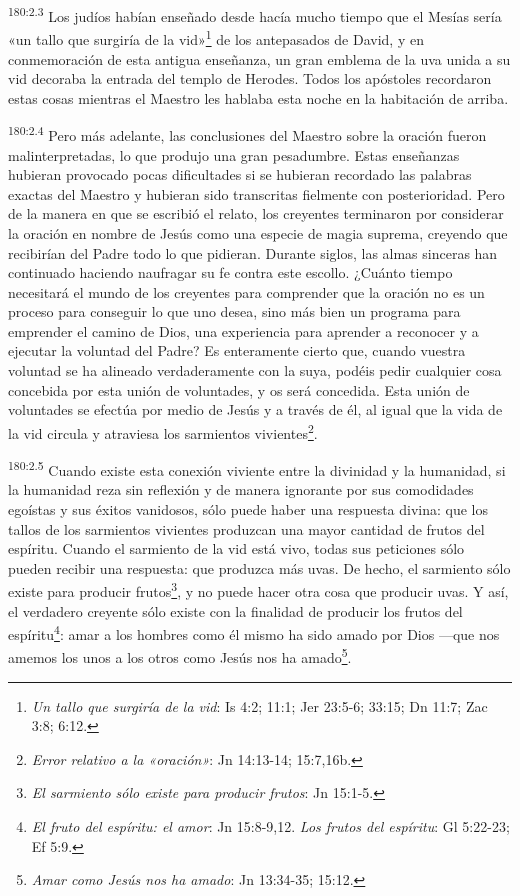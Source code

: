 \par
\textsuperscript{180:2.3} Los judíos habían enseñado desde hacía mucho tiempo que el Mesías sería «un tallo que surgiría de la vid»\footnote{\textit{Un tallo que surgiría de la vid}: Is 4:2; 11:1; Jer 23:5-6; 33:15; Dn 11:7; Zac 3:8; 6:12.} de los antepasados de David, y en conmemoración de esta antigua enseñanza, un gran emblema de la uva unida a su vid decoraba la entrada del templo de Herodes. Todos los apóstoles recordaron estas cosas mientras el Maestro les hablaba esta noche en la habitación de arriba.

\par
\textsuperscript{180:2.4} Pero más adelante, las conclusiones del Maestro sobre la oración fueron malinterpretadas, lo que produjo una gran pesadumbre. Estas enseñanzas hubieran provocado pocas dificultades si se hubieran recordado las palabras exactas del Maestro y hubieran sido transcritas fielmente con posterioridad. Pero de la manera en que se escribió el relato, los creyentes terminaron por considerar la oración en nombre de Jesús como una especie de magia suprema, creyendo que recibirían del Padre todo lo que pidieran. Durante siglos, las almas sinceras han continuado haciendo naufragar su fe contra este escollo. ¿Cuánto tiempo necesitará el mundo de los creyentes para comprender que la oración no es un proceso para conseguir lo que uno desea, sino más bien un programa para emprender el camino de Dios, una experiencia para aprender a reconocer y a ejecutar la voluntad del Padre? Es enteramente cierto que, cuando vuestra voluntad se ha alineado verdaderamente con la suya, podéis pedir cualquier cosa concebida por esta unión de voluntades, y os será concedida. Esta unión de voluntades se efectúa por medio de Jesús y a través de él, al igual que la vida de la vid circula y atraviesa los sarmientos vivientes\footnote{\textit{Error relativo a la «oración»}: Jn 14:13-14; 15:7,16b.}.

\par
\textsuperscript{180:2.5} Cuando existe esta conexión viviente entre la divinidad y la humanidad, si la humanidad reza sin reflexión y de manera ignorante por sus comodidades egoístas y sus éxitos vanidosos, sólo puede haber una respuesta divina: que los tallos de los sarmientos vivientes produzcan una mayor cantidad de frutos del espíritu. Cuando el sarmiento de la vid está vivo, todas sus peticiones sólo pueden recibir una respuesta: que produzca más uvas. De hecho, el sarmiento sólo existe para producir frutos\footnote{\textit{El sarmiento sólo existe para producir frutos}: Jn 15:1-5.}, y no puede hacer otra cosa que producir uvas. Y así, el verdadero creyente sólo existe con la finalidad de producir los frutos del espíritu\footnote{\textit{El fruto del espíritu: el amor}: Jn 15:8-9,12. \textit{Los frutos del espíritu}: Gl 5:22-23; Ef 5:9.}: amar a los hombres como él mismo ha sido amado por Dios ---que nos amemos los unos a los otros como Jesús nos ha amado\footnote{\textit{Amar como Jesús nos ha amado}: Jn 13:34-35; 15:12.}.

